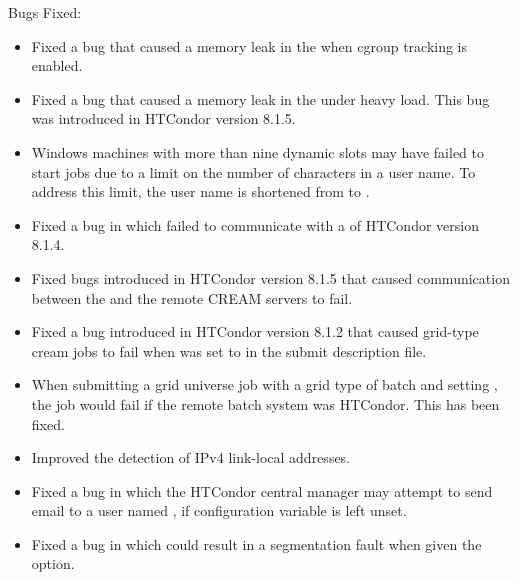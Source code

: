\noindent Bugs Fixed:

\begin{itemize}

\item Fixed a bug that caused a memory leak in the 
when cgroup tracking is enabled.

\item Fixed a bug that caused a memory leak in the 
under heavy load.  This bug was introduced in HTCondor version 8.1.5.

\item Windows machines with more than nine dynamic slots may have
failed to start jobs due to a limit on the number of characters
in a user name.
To address this limit, the user name is shortened from
 to .

\item Fixed a bug in which  failed to communicate with a
 of HTCondor version 8.1.4.

\item Fixed bugs introduced in HTCondor version 8.1.5 that caused communication
between the  and the remote CREAM servers to fail.

\item Fixed a bug introduced in HTCondor version 8.1.2 that caused grid-type
cream jobs to fail when  was set to 
in the submit description file.

\item When submitting a grid universe job with a grid type of batch and
setting , the job would fail if the remote
batch system was HTCondor. This has been fixed.

\item Improved the detection of IPv4 link-local addresses.

\item Fixed a bug in which the HTCondor central manager may attempt to
send email to a user named , if configuration variable
 is left unset.

\item Fixed a bug in which  could result in a
segmentation fault when given the  option.


\end{itemize}
